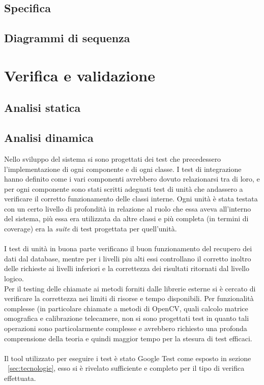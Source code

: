 \documentclass[a4paper,13pt,twoside]{article}
\begin{document}
\newpage
\subsection{Specifica} \label{sec:specifica}

\subsection{Diagrammi di sequenza} \label{sec:sequenza}

\clearpage

\section{Verifica e validazione} \label{sec:vev}
\subsection{Analisi statica} \label{sec:anstat}


\subsection{Analisi dinamica}
Nello sviluppo del sistema si sono progettati dei test che precedessero l'implementazione di ogni componente e di ogni classe. I test di integrazione hanno definito come i vari componenti avrebbero dovuto relazionarsi tra di loro, e per ogni componente sono stati scritti adeguati test di unità che andassero a verificare il corretto funzionamento delle classi interne. Ogni unità è stata testata con un certo livello di profondità in relazione al ruolo che essa aveva all'interno del sistema, più essa era utilizzata da altre classi e più completa (in termini di coverage) era la \textit{suite} di test progettata per quell'unità. \\ \\
I test di unità in buona parte verificano il buon funzionamento del recupero dei dati dal database, mentre per i livelli piu alti essi controllano il corretto inoltro delle richieste ai livelli inferiori e la correttezza dei risultati ritornati dal livello logico. \\
Per il testing delle chiamate ai metodi forniti dalle librerie esterne si è cercato di verificare la correttezza nei limiti di risorse e tempo disponibili. Per funzionalità complesse (in particolare chiamate a metodi di OpenCV, quali calcolo matrice omografica e calibrazione telecamere, non si sono progettati test in quanto tali operazioni sono particolarmente complesse e avrebbero richiesto una profonda comprensione della teoria e quindi maggior tempo per la stesura di test efficaci. \\ \\
Il tool utilizzato per eseguire i test è stato Google Test come esposto in sezione ~\ref{sec:tecnologie}, esso si è rivelato sufficiente e completo per il tipo di verifica effettuata.
\end{document}
